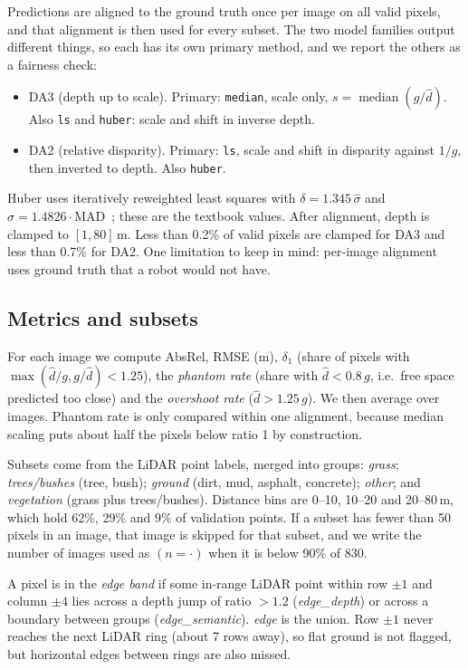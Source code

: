 \documentclass[conference]{IEEEtran}
\newcommand{\absrel}{AbsRel}
\newcommand{\dOne}{$\delta_1$}
\newcommand{\gt}{g}
\newcommand{\pred}{\hat{d}}
\begin{document}
Predictions are aligned to the ground truth once per image on all valid pixels, and that alignment is then used for every subset. The two model families output different things, so each has its own primary method, and we report the others as a fairness check:
\begin{itemize}
\item DA3 (depth up to scale). Primary: \texttt{median}, scale only, $s=\operatorname{median}(\gt/\pred)$. Also \texttt{ls} and \texttt{huber}: scale and shift in inverse depth.
\item DA2 (relative disparity). Primary: \texttt{ls}, scale and shift in disparity against $1/\gt$, then inverted to depth. Also \texttt{huber}.
\end{itemize}
Huber uses iteratively reweighted least squares with $\delta=1.345\,\hat\sigma$ and $\hat\sigma=1.4826\cdot\mathrm{MAD}$~\cite{huber}; these are the textbook values. After alignment, depth is clamped to $[1,80]$\,m. Less than 0.2\% of valid pixels are clamped for DA3 and less than 0.7\% for DA2. One limitation to keep in mind: per-image alignment uses ground truth that a robot would not have.

\subsection{Metrics and subsets}
For each image we compute \absrel{}, RMSE (m), \dOne{} (share of pixels with $\max(\pred/\gt,\gt/\pred)<1.25$), the \emph{phantom rate} (share with $\pred<0.8\,\gt$, i.e.\ free space predicted too close) and the \emph{overshoot rate} ($\pred>1.25\,\gt$). We then average over images. Phantom rate is only compared within one alignment, because median scaling puts about half the pixels below ratio 1 by construction.

Subsets come from the LiDAR point labels, merged into groups: \emph{grass}; \emph{trees/bushes} (tree, bush); \emph{ground} (dirt, mud, asphalt, concrete); \emph{other}; and \emph{vegetation} (grass plus trees/bushes). Distance bins are 0--10, 10--20 and 20--80\,m, which hold 62\%, 29\% and 9\% of validation points. If a subset has fewer than 50 pixels in an image, that image is skipped for that subset, and we write the number of images used as $(n{=}\cdot)$ when it is below 90\% of 830.

A pixel is in the \emph{edge band} if some in-range LiDAR point within row $\pm1$ and column $\pm4$ lies across a depth jump of ratio $>1.2$ (\emph{edge\_depth}) or across a boundary between groups (\emph{edge\_semantic}). \emph{edge} is the union. Row $\pm1$ never reaches the next LiDAR ring (about 7 rows away), so flat ground is not flagged, but horizontal edges between rings are also missed.
\end{document}
